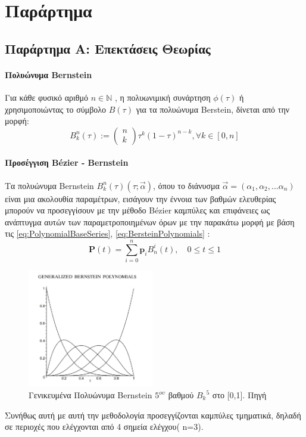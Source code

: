 \chapter{Παράρτημα}
\label{chapter:appendix}

\begin{appendices}
    \section*{Παράρτημα Α: Επεκτάσεις Θεωρίας}
    \subsubsection{Πολυώνυμα Bernstein}
    Για κάθε φυσικό αριθμό $n \in \mathbb{N}$ , η πολυωνιμική συνάρτηση $\phi(\tau)$ ή χρησιμοποιώντας το σύμβολο $B(\tau)$ για τα πολυώνυμα Berstein, δίνεται από την μορφή:
    \begin{equation}
        B_k^n(\tau):=\left(\begin{array}{l} n \\k \end{array}\right) \tau^k(1-\tau)^{n-k},   \forall k \in [0,n]
        \label{eq:BersteinPolynomials}
    \end{equation}

    \subsubsection{Προσέγγιση Bézier - Bernstein}
    Τα πολυώνυμα Bernstein $B_k^n(\tau)(\tau;\Vec{\alpha})$, όπου το διάνυσμα $\Vec{\alpha} = (\alpha_1,\alpha_2,...\alpha_n)$ είναι μια ακολουθία παραμέτρων, εισάγουν την έννοια των βαθμών ελευθερίας μπορούν να προσεγγίσουν με την μέθοδο Bézier καμπύλες και επιφάνειες ως ανάπτυγμα αυτών των παραμετροποιημένων όρων  με την παρακάτω μορφή με βάση τις \ref{eq:PolynomialBaseSeries}, \ref{eq:BersteinPolynomials} : 
    \begin{equation*}
        \mathbf{P}(t)=\sum_{i=0}^n \mathbf{p}_i B^{i}_{n}(t), \quad 0 \leq t \leq 1
    \end{equation*}

    \begin{figure}[!tbh]
    \centering
    \includegraphics[width=5.5cm]{images/chapter2_img/GenerelizedBersteinPolynomials.jpg}
    \caption{Γενικευμένα Πολυώνυμα Bernstein $5^{ου}$ βαθμού ${B_{k}}^{5} $ στο [0,1]. Πηγή \cite{winkel2001generalized}}
    \label{fig:2 Generalized Bernstein Polynomials}
    \end{figure} 
    Συνήθως αυτή με αυτή την μεθοδολογία προσεγγίζονται καμπύλες τμηματικά, δηλαδή σε περιοχές που ελέγχονται από 4 σημεία ελέγχου( n=3).

\end{appendices}
